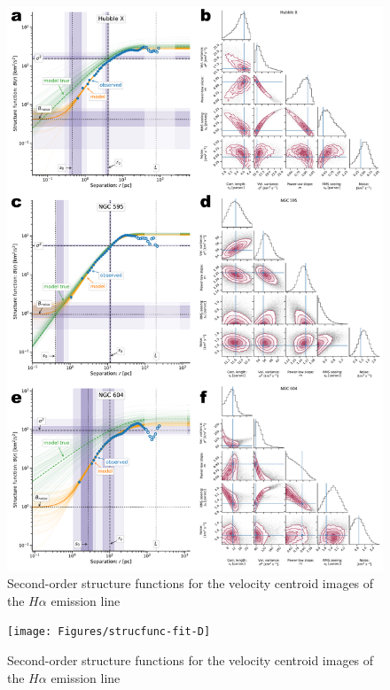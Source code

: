 \documentclass[fleqn,usenatbib, useAMS, a4paper]{mnras}
\begin{document}
\begin{figure}
  \centering
  \includegraphics[width=0.8\linewidth]{Figures/strucfunc-fit-C}
  \caption{Second-order structure functions for the velocity centroid images of the \(H\alpha\) emission line}\label{fig:strucfunc-fit-C}
\end{figure}

\begin{figure}
  \centering
  \texttt{[image: Figures/strucfunc-fit-D]}
  \caption{Second-order structure functions for the velocity centroid images of the \(H\alpha\) emission line}\label{fig:strucfunc-fit-D}
\end{figure}
\end{document}
